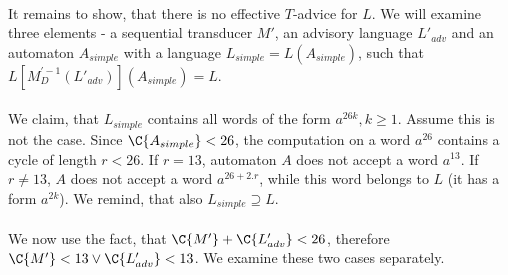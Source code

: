 \paragraph{}
It remains to show, that there is no effective $T$-advice for $L$. We will examine three elements - a sequential transducer $M'$, an advisory language $L'_{adv}$ and an automaton $A_{simple}$ with a language $L_{simple} = L(A_{simple})$, such that $L[M_{D}^{'-1}(L'_{adv})](A_{simple}) = L$.

\paragraph{}
We claim, that $L_{simple}$ contains all words of the form $a^{26k}, k \geq 1$. Assume this is not the case. Since $\C{A_{simple}} < 26$, the computation on a word $a^{26}$ contains a cycle of length $r < 26$. If $r = 13$, automaton $A$ does not accept a word $a^{13}$. If $r \neq 13$, $A$ does not accept a word $a^{26+2.r}$, while this word belongs to $L$ (it has a form $a^{2k}$). We remind, that also $L_{simple} \supseteq L$.

\paragraph{}
We now use the fact, that $\C{M'} + \C{L'_{adv}} < 26$, therefore $\C{M'}<13 \vee \C{L'_{adv}} < 13$. We examine these two cases separately.

